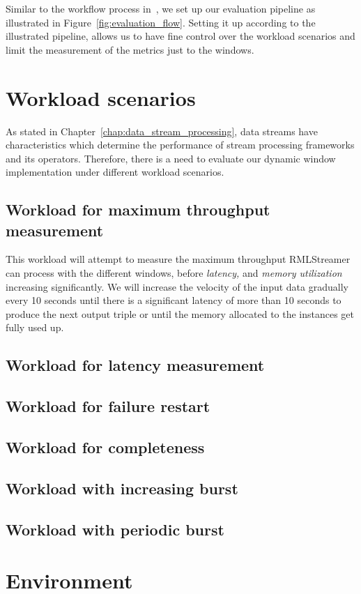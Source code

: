 Similar to the workflow process in~\cite{evalution_of_spe, benchmark_dsp}, we set up
our evaluation pipeline as illustrated in Figure~\ref{fig:evaluation_flow}. Setting it 
up according to the illustrated pipeline, allows us to have fine control over the 
workload scenarios and limit the measurement of the metrics just to the windows. 



\section{Workload scenarios}
As stated in Chapter~\ref{chap:data_stream_processing}, data streams have characteristics 
which determine the performance of stream processing frameworks and its operators. Therefore, 
there is a need to evaluate our dynamic window implementation under different workload scenarios. 

\subsection{Workload for maximum throughput measurement}
This workload will attempt to measure the maximum throughput RMLStreamer can 
process with the different windows, before \emph{latency,} and \emph{memory utilization}
increasing significantly. We will increase the velocity of the input data gradually 
every 10 seconds until there is a significant latency of more than 10 seconds to produce
the next output triple or until the memory allocated to the instances get fully used up. 


\subsection{Workload for latency measurement}



\subsection{Workload for failure restart}


\subsection{Workload for completeness}

\subsection{Workload with increasing burst }

\subsection{Workload with periodic burst}


\section{Environment}




